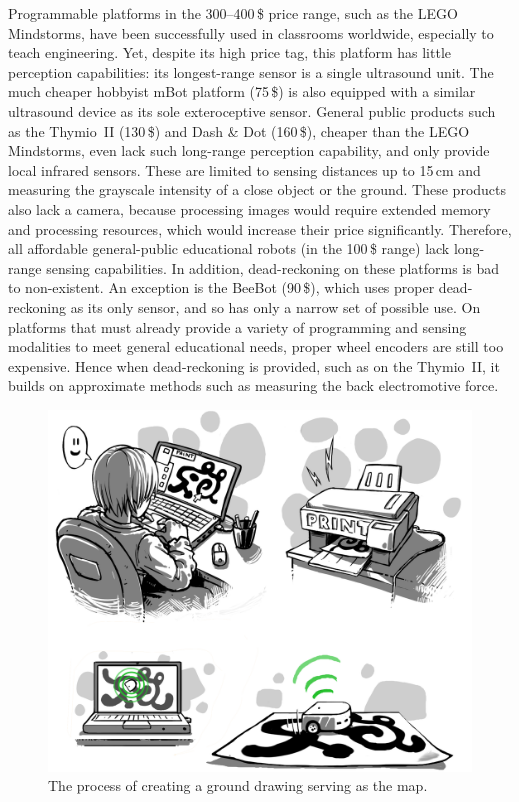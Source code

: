 \documentclass[letterpaper, 10pt, conference]{ieeeconf}
\begin{document}
Programmable platforms in the 300--400\,\$ price range, such as the LEGO Mindstorms, have been successfully used in classrooms worldwide, especially to teach engineering.
Yet, despite its high price tag, this platform has little perception capabilities: its longest-range sensor is a single ultrasound unit.
The much cheaper hobbyist mBot platform (75\,\$) is also equipped with a similar ultrasound device as its sole exteroceptive sensor.
General public products such as the Thymio~II (130\,\$) and Dash \& Dot (160\,\$), cheaper than the LEGO Mindstorms, even lack such long-range perception capability, and only provide local infrared sensors.
These are limited to sensing distances up to 15\,cm and measuring the grayscale intensity of a close object or the ground.
These products also lack a camera, because processing images would require extended memory and processing resources, which would increase their price significantly.
Therefore, all affordable general-public educational robots (in the 100\,\$ range) lack long-range sensing capabilities.
In addition, dead-reckoning on these platforms is bad to non-existent.
An exception is the BeeBot (90\,\$), which uses proper dead-reckoning as its only sensor, and so has only a narrow set of possible use.
On platforms that must already provide a variety of programming and sensing modalities to meet general educational needs, proper wheel encoders are still too expensive.
Hence when dead-reckoning is provided, such as on the Thymio~II, it builds on approximate methods such as measuring the back electromotive force.


\begin{figure}
\includegraphics[width=\columnwidth]{process_creation_col_small}
\caption{The process of creating a ground drawing serving as the map.}
\label{fig:process}
\end{figure}
\end{document}
